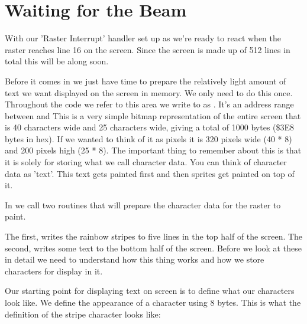 \section{Waiting for the Beam}
With our 'Raster Interrupt' handler set up as  we're ready to 
react when the raster reaches line 16 on the screen. Since the screen is made up of 512 lines in
total this will be along soon.

Before it comes in we just have time to prepare the relatively light amount of text we want displayed
on the screen in memory. We only need to do this once. Throughout the code we refer to this
area we write to as . It's an address range between  and  This is a very
simple bitmap representation of the entire screen that is 40 characters wide and 25 characters wide,
giving a total of 1000 bytes (\$3E8 bytes in hex). If we wanted to think of it as pixels it is 320 pixels wide (40 * 8)
and 200 pixels high (25 * 8). The important thing to remember about this  is that it is solely
for storing what we call character data. You can think of character data as 'text'. This text gets painted
first and then sprites get painted on top of it.

In  we call two routines that will prepare the character data for the raster to paint. 

The first,  writes the rainbow stripes to five lines in the top half of the screen. 
The second,  writes some text to the bottom half of the screen. Before we look at these
in detail we need to understand how this thing  works and how we store characters for display in it.

Our starting point for displaying text on screen is to define what our characters look like. We define the appearance
of a character using 8 bytes. This is what the definition of the stripe character looks like: 

